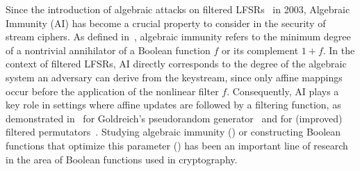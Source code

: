 \documentclass[11pt]{llncs}
\begin{document}



Since the introduction of algebraic attacks on filtered LFSRs~\cite{EC:CouMei03} in 2003, Algebraic Immunity (AI) has become a crucial property to consider in the security of stream ciphers. 
As defined in~\cite{EC:MeiPasCar04}, algebraic immunity refers to the minimum degree of a nontrivial annihilator of a Boolean function $f$ or its complement $1+f$. 
In the context of filtered LFSRs, AI directly corresponds to the degree of the algebraic system an adversary can derive from the keystream, since only affine mappings occur before the application of the nonlinear filter $f$. 
Consequently, AI plays a key role in settings where affine updates are followed by a filtering function, as demonstrated in~\cite{SIAM:AppLov18} for Goldreich's pseudorandom generator~\cite{Goldreich00} and for (improved) filtered permutators~\cite{EC:MJSC16,INDO:MCJS19}. 
Studying algebraic immunity (\eg \cite{IEEE:Didier06,AMC:CarMer13,DAM:Meaux22}) or constructing Boolean functions that optimize this parameter (\eg \cite{DCC:DalMaiSar06,ISIT:Carlet07,AC:CarFen08,IEEE:QFLW09,IEEE:ZCSH11,DCC:TuDen11}) has been an important line of research in the area of Boolean functions used in cryptography.
\end{document}
